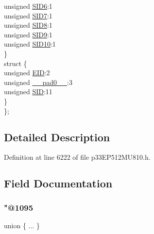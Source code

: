 \begin{DoxyCompactItemize}
\begin{tabbing}
\>\>unsigned \hyperlink{structtag_c2_r_x_f1_s_i_d_b_i_t_s_a70d70952133eb2389d5c326f9f0e8035}{SID6}:1\\
\>\>unsigned \hyperlink{structtag_c2_r_x_f1_s_i_d_b_i_t_s_a34097fb76decd431701fa2d86a22328e}{SID7}:1\\
\>\>unsigned \hyperlink{structtag_c2_r_x_f1_s_i_d_b_i_t_s_afe74894633244fdb0b0c01b4e8c522e7}{SID8}:1\\
\>\>unsigned \hyperlink{structtag_c2_r_x_f1_s_i_d_b_i_t_s_a33587704948067005c2a6a3ccc503c99}{SID9}:1\\
\>\>unsigned \hyperlink{structtag_c2_r_x_f1_s_i_d_b_i_t_s_a1a9084031c7f5fb16007feeebf0d8216}{SID10}:1\\
\>\} \\
\>struct \{\\
\>\>unsigned \hyperlink{structtag_c2_r_x_f1_s_i_d_b_i_t_s_ae80b378c9141f7c03e0b4e55b5f4b54d}{EID}:2\\
\>\>unsigned \hyperlink{structtag_c2_r_x_f1_s_i_d_b_i_t_s_adf71f3d8410c1f1dbbc96680a92c49af}{\_\_pad0\_\_}:3\\
\>\>unsigned \hyperlink{structtag_c2_r_x_f1_s_i_d_b_i_t_s_af88edf93b2fee2432665bd84f51287e4}{SID}:11\\
\>\} \\
\}; \\

\end{tabbing}\end{DoxyCompactItemize}


\subsection{Detailed Description}


Definition at line 6222 of file p33\+E\+P512\+M\+U810.\+h.



\subsection{Field Documentation}
\mbox{\label{structtag_c2_r_x_f1_s_i_d_b_i_t_s_a9974f5e10096d9e787e11d624460b399}} 
\subsubsection{\texorpdfstring{"@1095}{@1095}}
{\footnotesize\ttfamily union \{ ... \} }

\mbox{\label{structtag_c2_r_x_f1_s_i_d_b_i_t_s_adf71f3d8410c1f1dbbc96680a92c49af}} 
